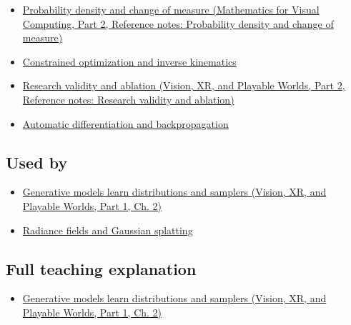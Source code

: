 \hypertarget{appendix-2c568f05ee34-prerequisites}{}

\begin{itemize}
\tightlist
\item
  \href{../02-Mathematics-for-Visual-Computing-P02/main.pdf\#appendix-4815cd87ab8b}{Probability density and change of measure (Mathematics for Visual Computing, Part 2, Reference notes: Probability density and change of measure)}
\item
  \hyperref[appendix-29f4bea4c2bb]{Constrained optimization and inverse kinematics}
\item
  \href{../07-Vision-XR-and-Playable-Worlds-P02/main.pdf\#appendix-65788587ef78}{Research validity and ablation (Vision, XR, and Playable Worlds, Part 2, Reference notes: Research validity and ablation)}
\item
  \hyperref[appendix-40df0855b4a7]{Automatic differentiation and backpropagation}
\end{itemize}

\subsection{Used by}\label{appendix-2c568f05ee34-used-by}

\hypertarget{appendix-2c568f05ee34-used-by}{}

\begin{itemize}
\tightlist
\item
  \href{../07-Vision-XR-and-Playable-Worlds-P01/main.pdf\#04-visual-computing-ii-ch031-generative-models-learn-distributions-and-samplers}{Generative models learn distributions and samplers (Vision, XR, and Playable Worlds, Part 1, Ch. 2)}
\item
  \hyperref[appendix-c5b332e400e7]{Radiance fields and Gaussian splatting}
\end{itemize}

\subsection{Full teaching explanation}\label{appendix-2c568f05ee34-full-teaching-explanation}

\hypertarget{appendix-2c568f05ee34-full-teaching-explanation}{}

\begin{itemize}
\tightlist
\item
  \href{../07-Vision-XR-and-Playable-Worlds-P01/main.pdf\#04-visual-computing-ii-ch031-generative-models-learn-distributions-and-samplers}{Generative models learn distributions and samplers (Vision, XR, and Playable Worlds, Part 1, Ch. 2)}
\end{itemize}

